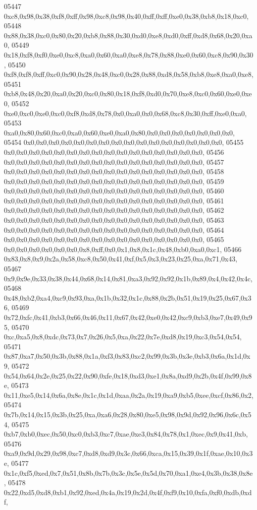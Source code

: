 \begin{DoxyCode}
05447   0xc8,0x98,0x38,0xf8,0xff,0x98,0xc8,0x98,0x40,0xff,0xff,0xe0,0x38,0xb8,0x18,0xc0,
05448   0x88,0x38,0xc0,0x80,0x20,0xb8,0x88,0x30,0xd0,0xe8,0xd0,0xff,0xd8,0x68,0x20,0xa0,
05449   0x18,0xf8,0xf0,0xe0,0xc8,0xa0,0x60,0xa0,0xe8,0x78,0x88,0xe0,0x60,0xc8,0x90,0x30,
05450   0xf8,0xf8,0xff,0xc0,0x90,0x28,0x48,0xc0,0x28,0x88,0xd8,0x58,0xb8,0xe8,0xa0,0xe8,
05451   0xb8,0x48,0x20,0xa0,0x20,0xc0,0x80,0x18,0xf8,0xd0,0x70,0xe8,0xc0,0x60,0xe0,0xe0,
05452   0xe0,0xc0,0xe0,0xc0,0xf8,0xd8,0x78,0x0,0xa0,0x0,0x68,0xc8,0x30,0xff,0xe0,0xa0,
05453   0xa0,0x80,0x60,0xc0,0xa0,0x60,0xe0,0xa0,0x80,0x0,0x0,0x0,0x0,0x0,0x0,0x0,
05454   0x0,0x0,0x0,0x0,0x0,0x0,0x0,0x0,0x0,0x0,0x0,0x0,0x0,0x0,0x0,0x0,
05455   0x0,0x0,0x0,0x0,0x0,0x0,0x0,0x0,0x0,0x0,0x0,0x0,0x0,0x0,0x0,0x0,
05456   0x0,0x0,0x0,0x0,0x0,0x0,0x0,0x0,0x0,0x0,0x0,0x0,0x0,0x0,0x0,0x0,
05457   0x0,0x0,0x0,0x0,0x0,0x0,0x0,0x0,0x0,0x0,0x0,0x0,0x0,0x0,0x0,0x0,
05458   0x0,0x0,0x0,0x0,0x0,0x0,0x0,0x0,0x0,0x0,0x0,0x0,0x0,0x0,0x0,0x0,
05459   0x0,0x0,0x0,0x0,0x0,0x0,0x0,0x0,0x0,0x0,0x0,0x0,0x0,0x0,0x0,0x0,
05460   0x0,0x0,0x0,0x0,0x0,0x0,0x0,0x0,0x0,0x0,0x0,0x0,0x0,0x0,0x0,0x0,
05461   0x0,0x0,0x0,0x0,0x0,0x0,0x0,0x0,0x0,0x0,0x0,0x0,0x0,0x0,0x0,0x0,
05462   0x0,0x0,0x0,0x0,0x0,0x0,0x0,0x0,0x0,0x0,0x0,0x0,0x0,0x0,0x0,0x0,
05463   0x0,0x0,0x0,0x0,0x0,0x0,0x0,0x0,0x0,0x0,0x0,0x0,0x0,0x0,0x0,0x0,
05464   0x0,0x0,0x0,0x0,0x0,0x0,0x0,0x0,0x0,0x0,0x0,0x0,0x0,0x0,0x0,0x0,
05465   0x0,0x0,0x0,0x0,0x0,0x0,0x8,0xff,0x0,0x1,0x8,0x1c,0x48,0xb0,0xa0,0xc1,
05466   0x83,0x8,0x9,0x2a,0x58,0xc8,0x50,0x41,0xf,0x5,0x3,0x23,0x25,0xa,0x71,0x43,
05467   0x9,0x9e,0x33,0x38,0x44,0x68,0x14,0x81,0xa3,0x92,0x92,0x1b,0x89,0x4,0x42,0x4c,
05468   0x48,0xb2,0xa4,0xc9,0x93,0xa,0x1b,0x32,0x1c,0x88,0x2b,0x51,0x19,0x25,0x67,0x36,
05469   0x72,0xfc,0x41,0xb3,0x66,0x46,0x11,0x67,0x42,0xe0,0x42,0xc9,0xb3,0xe7,0x49,0x95,
05470   0xc,0xa5,0x8,0xdc,0x73,0x7,0x26,0x5,0xa,0x22,0x7e,0xd8,0x19,0xc3,0x54,0x54,
05471   0x87,0xa7,0x50,0x3b,0x88,0x1a,0xf3,0x83,0xc2,0x99,0x3b,0x3e,0xb3,0x6a,0x1d,0x9,
05472   0x54,0x64,0x2e,0x25,0x22,0x90,0xfe,0x18,0xd3,0xe1,0x8a,0xd9,0x2b,0x4f,0x99,0x8e,
05473   0x11,0xe5,0x14,0x6a,0x8e,0x1c,0x1d,0xaa,0x2a,0x19,0xa9,0xb5,0xee,0xcf,0x86,0x2,
05474   0x7b,0x14,0x15,0x3b,0x25,0xa,0xa6,0x28,0x80,0xe5,0x98,0x9d,0x92,0x96,0x6c,0x54,
05475   0xb7,0xb0,0xec,0x50,0xc0,0xb3,0xc7,0xae,0xe3,0x84,0x78,0x1,0xec,0x9,0x41,0xb,
05476   0xa9,0x9d,0x29,0x98,0xc7,0xd8,0xd9,0x3c,0x66,0xca,0x15,0x39,0x1f,0xae,0x10,0x3e,
05477   0x1c,0xf5,0xed,0x7,0x51,0x8b,0x7b,0x3c,0x5e,0x5d,0x70,0xa1,0xe4,0x3b,0x38,0x8e,
05478   0x22,0xd5,0xd8,0xb1,0x92,0xed,0x4a,0x19,0x2d,0x4f,0xf9,0x10,0xfa,0xf0,0xdb,0xdf,

\end{DoxyCode}
